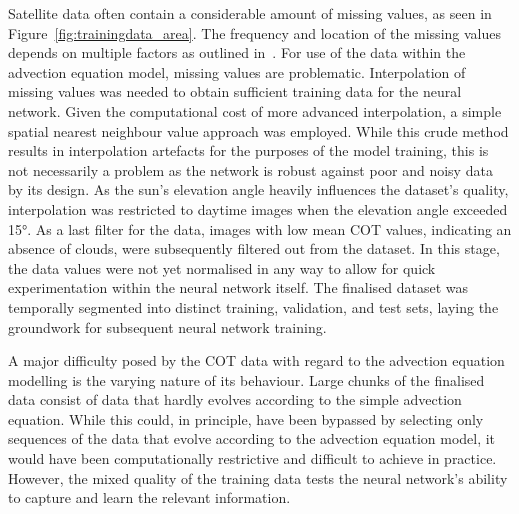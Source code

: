 Satellite data often contain a considerable amount of missing values, as seen in Figure~\ref{fig:trainingdata_area}.
The frequency and location of the missing values depends on multiple factors as outlined in~\cite{nwcsaf}.  
For use of the data within the advection equation model, missing values are problematic.
Interpolation of missing values was needed to obtain sufficient training data for the neural network.
Given the computational cost of more advanced interpolation, a simple spatial nearest neighbour value approach was employed.
While this crude method results in interpolation artefacts for the purposes of the model training, this is not necessarily a problem as the network is robust against poor and noisy data by its design.
As the sun's elevation angle heavily influences the dataset's quality, interpolation was restricted to daytime images when the elevation angle exceeded \ang{15}.
As a last filter for the data, images with low mean COT values, indicating an absence of clouds, were subsequently filtered out from the dataset.
In this stage, the data values were not yet normalised in any way to allow for quick experimentation within the neural network itself.
The finalised dataset was temporally segmented into distinct training, validation, and test sets, laying the groundwork for subsequent neural network training.

A major difficulty posed by the COT data with regard to the advection equation modelling is the varying nature of its behaviour.
Large chunks of the finalised data consist of data that hardly evolves according to the simple advection equation.
While this could, in principle, have been bypassed by selecting only sequences of the data that evolve according to the advection equation model, it would have been computationally restrictive and difficult to achieve in practice.
However, the mixed quality of the training data tests the neural network's ability to capture and learn the relevant information.
